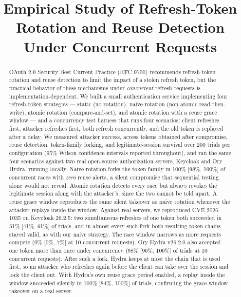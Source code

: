 \documentclass[conference]{IEEEtran}
\begin{document}
\title{Empirical Study of Refresh-Token Rotation and Reuse Detection\\
Under Concurrent Requests}

\author{
}

\maketitle

\begin{abstract}
OAuth 2.0 Security Best Current Practice (RFC 9700) recommends refresh-token
rotation and reuse detection to limit the impact of a stolen refresh token,
but the practical behavior of these mechanisms under \emph{concurrent}
refresh requests is implementation-dependent. We built a small authentication
service implementing four refresh-token strategies --- static (no rotation),
naive rotation (non-atomic read-then-write), atomic rotation
(compare-and-set), and atomic rotation with a reuse grace window --- and a
concurrency test harness that runs four scenarios: client refreshes first,
attacker refreshes first, both refresh concurrently, and the old token is
replayed after a delay. We measured attacker success, access tokens
obtained after compromise, reuse detection, token-family forking, and
legitimate-session survival over 200 trials per configuration (95\% Wilson
confidence intervals reported throughout), and ran the same four scenarios
against two real open-source authorization servers, Keycloak and Ory
Hydra, running locally.
Naive rotation forks the token family in 100\% [98\%, 100\%] of concurrent
races with \emph{zero} reuse alerts, a silent compromise that sequential
testing alone would not reveal. Atomic rotation detects every race but
always revokes the legitimate session along with the attacker's, since the
two cannot be told apart. A reuse grace window reproduces the same silent
takeover as naive rotation whenever the attacker replays inside the window.
Against real servers, we reproduced CVE-2026-1035 on Keycloak 26.2.5: two
simultaneous refreshes of one token both succeeded in 51\% [41\%, 61\%] of
trials, and in almost every such fork both resulting token chains stayed
valid, as with our naive strategy. The race window narrows as more requests compete
(0\% [0\%, 7\%] at 10 concurrent requests). Ory Hydra v26.2.0 also
accepted one token more than once under concurrency (98\% [90\%, 100\%] of
trials at 10 concurrent requests). After such a fork, Hydra keeps at most
the chain that is used first, so an attacker who refreshes again before
the client can take over the session and lock the client out. With Hydra's own
reuse grace period enabled,
a replay inside the window succeeded silently in 100\% [84\%, 100\%] of
trials, confirming the grace-window takeover on a real server.
\end{abstract}
\end{document}
